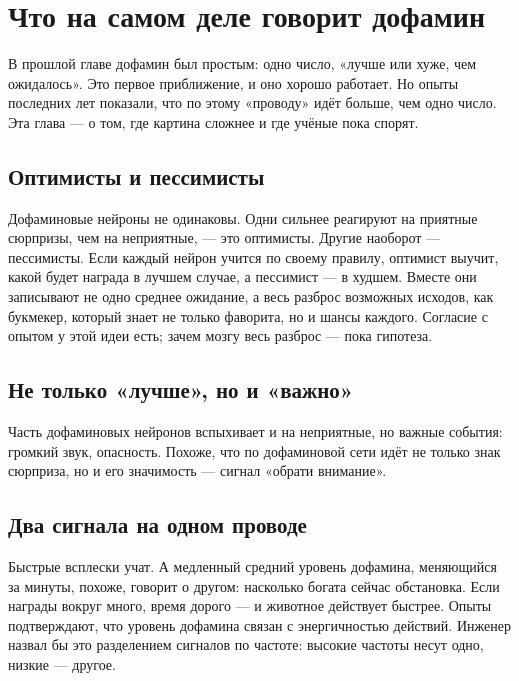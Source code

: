 \chapter{Что на самом деле говорит дофамин}

В прошлой главе дофамин был простым: одно число, «лучше или хуже, чем ожидалось». Это первое приближение, и оно хорошо работает. Но опыты последних лет показали, что по этому «проводу» идёт больше, чем одно число. Эта глава --- о том, где картина сложнее и где учёные пока спорят.

\section*{Оптимисты и пессимисты}

Дофаминовые нейроны не одинаковы. Одни сильнее реагируют на приятные сюрпризы, чем на неприятные, --- это оптимисты. Другие наоборот --- пессимисты. Если каждый нейрон учится по своему правилу, оптимист выучит, какой будет награда в лучшем случае, а пессимист --- в худшем. Вместе они записывают не одно среднее ожидание, а весь разброс возможных исходов, как букмекер, который знает не только фаворита, но и шансы каждого. Согласие с опытом у этой идеи есть; зачем мозгу весь разброс --- пока гипотеза.


\section*{Не только «лучше», но и «важно»}

Часть дофаминовых нейронов вспыхивает и на неприятные, но важные события: громкий звук, опасность. Похоже, что по дофаминовой сети идёт не только знак сюрприза, но и его значимость --- сигнал «обрати внимание».

\section*{Два сигнала на одном проводе}

Быстрые всплески учат. А медленный средний уровень дофамина, меняющийся за минуты, похоже, говорит о другом: насколько богата сейчас обстановка. Если награды вокруг много, время дорого --- и животное действует быстрее. Опыты подтверждают, что уровень дофамина связан с энергичностью действий. Инженер назвал бы это разделением сигналов по частоте: высокие частоты несут одно, низкие --- другое.

